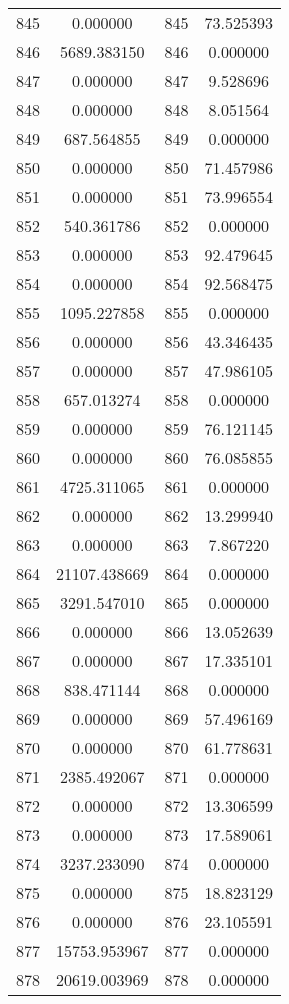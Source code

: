 \documentclass[12pt]{article}
\begin{document}
\begin{longtable}{@{}cccc@{}}
845 & 0.000000 & 845 & 73.525393 \\
846 & 5689.383150 & 846 & 0.000000 \\
847 & 0.000000 & 847 & 9.528696 \\
848 & 0.000000 & 848 & 8.051564 \\
849 & 687.564855 & 849 & 0.000000 \\
850 & 0.000000 & 850 & 71.457986 \\
851 & 0.000000 & 851 & 73.996554 \\
852 & 540.361786 & 852 & 0.000000 \\
853 & 0.000000 & 853 & 92.479645 \\
854 & 0.000000 & 854 & 92.568475 \\
855 & 1095.227858 & 855 & 0.000000 \\
856 & 0.000000 & 856 & 43.346435 \\
857 & 0.000000 & 857 & 47.986105 \\
858 & 657.013274 & 858 & 0.000000 \\
859 & 0.000000 & 859 & 76.121145 \\
860 & 0.000000 & 860 & 76.085855 \\
861 & 4725.311065 & 861 & 0.000000 \\
862 & 0.000000 & 862 & 13.299940 \\
863 & 0.000000 & 863 & 7.867220 \\
864 & 21107.438669 & 864 & 0.000000 \\
865 & 3291.547010 & 865 & 0.000000 \\
866 & 0.000000 & 866 & 13.052639 \\
867 & 0.000000 & 867 & 17.335101 \\
868 & 838.471144 & 868 & 0.000000 \\
869 & 0.000000 & 869 & 57.496169 \\
870 & 0.000000 & 870 & 61.778631 \\
871 & 2385.492067 & 871 & 0.000000 \\
872 & 0.000000 & 872 & 13.306599 \\
873 & 0.000000 & 873 & 17.589061 \\
874 & 3237.233090 & 874 & 0.000000 \\
875 & 0.000000 & 875 & 18.823129 \\
876 & 0.000000 & 876 & 23.105591 \\
877 & 15753.953967 & 877 & 0.000000 \\
878 & 20619.003969 & 878 & 0.000000 \\

\end{longtable}
\end{document}
